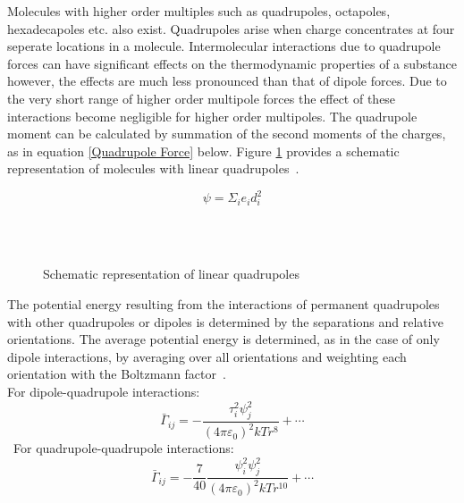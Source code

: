 Molecules with higher order multiples such as quadrupoles, octapoles, hexadecapoles etc. also exist. Quadrupoles arise when charge concentrates at four seperate locations in a molecule. Intermolecular interactions due to quadrupole forces can have significant effects on the thermodynamic properties of a substance however, the effects are much less pronounced than that of dipole forces. Due to the very short range of higher order multipole forces the effect of these interactions become negligible for higher order multipoles. The quadrupole moment can be calculated by summation of the second moments of the charges, as in equation \ref{Quadrupole Force} below. Figure \ref{QuadrupoleDrawing} provides a schematic representation of molecules with linear quadrupoles~\cite{MolecularThermodynamicsOfFluidPhaseEquilibria}.\

\begin{equation}
\psi = \Sigma_{i} \mathit{e}_{i} d_{i}^{2} \label{Quadrupole Force}
\end{equation}\


\begin{figure}
\begin{center}
\resizebox{0.8\textwidth}{!}{}\\
\end{center}
\caption{Schematic representation of linear quadrupoles} \label{QuadrupoleDrawing}
\end{figure}

The potential energy resulting from the interactions of permanent quadrupoles with other quadrupoles or dipoles is determined by the separations and relative orientations. The average potential energy is determined, as in the case of only dipole interactions, by averaging over all orientations and weighting each orientation with the Boltzmann factor~\cite{MolecularThermodynamicsOfFluidPhaseEquilibria}.\\

For dipole-quadrupole interactions:\
\begin{equation}
\bar{\Gamma}_{ij} = - \frac{\tau_{i}^{2} \psi_{j}^{2}}{\left(4\pi\varepsilon_{0}\right)^{2}kTr^{8}} +\cdots \label{Dipole-Quad Potential Average}
\end{equation}\
For quadrupole-quadrupole interactions:\
\begin{equation}
\bar{\Gamma}_{ij} = -\frac{7}{40} \frac{\psi_{i}^{2} \psi_{j}^{2}}{\left(4\pi\varepsilon_{0}\right)^{2}kTr^{10}} +\cdots \label{Quadrupole-Quad Potential Average}
\end{equation}\

